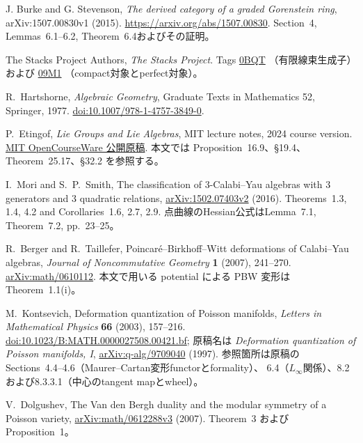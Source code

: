J. Burke and G. Stevenson, \emph{The derived category of a graded Gorenstein ring},
arXiv:1507.00830v1 (2015).
\url{https://arxiv.org/abs/1507.00830}.
Section~4, Lemmas~6.1--6.2, Theorem~6.4およびその証明。

The Stacks Project Authors, \emph{The Stacks Project}.
Tags \href{https://stacks.math.columbia.edu/tag/0BQT}{0BQT}
（有限線束生成子）および
\href{https://stacks.math.columbia.edu/tag/09M1}{09M1}
（compact対象とperfect対象）。

R.~Hartshorne,
\emph{Algebraic Geometry}, Graduate Texts in Mathematics 52,
Springer, 1977.
\href{https://doi.org/10.1007/978-1-4757-3849-0}{doi:10.1007/978-1-4757-3849-0}.

P.~Etingof,
\emph{Lie Groups and Lie Algebras}, MIT lecture notes, 2024 course version.
\href{https://live.ocw.mit.edu/courses/18-755-lie-groups-and-lie-algebras-ii-spring-2024/mit18_755_s24_lec_full.pdf}{MIT OpenCourseWare 公開原稿}.
本文では Proposition~16.9、\S19.4、Theorem~25.17、\S32.2 を参照する。

I.~Mori and S.~P.~Smith,
The classification of 3-Calabi--Yau algebras with 3 generators and 3 quadratic relations,
\href{https://arxiv.org/abs/1502.07403v2}{arXiv:1502.07403v2} (2016).
Theorems~1.3, 1.4, 4.2 and Corollaries~1.6, 2.7, 2.9.
点曲線のHessian公式はLemma~7.1, Theorem~7.2, pp.~23--25。

R.~Berger and R.~Taillefer,
Poincar\'e--Birkhoff--Witt deformations of Calabi--Yau algebras,
\emph{Journal of Noncommutative Geometry} \textbf{1} (2007), 241--270.
\href{https://arxiv.org/abs/math/0610112}{arXiv:math/0610112}.
本文で用いる potential による PBW 変形は Theorem~1.1(i)。

M.~Kontsevich,
Deformation quantization of Poisson manifolds,
\emph{Letters in Mathematical Physics} \textbf{66} (2003), 157--216.
\href{https://doi.org/10.1023/B:MATH.0000027508.00421.bf}{doi:10.1023/B:MATH.0000027508.00421.bf};
原稿名は \emph{Deformation quantization of Poisson manifolds, I},
\href{https://arxiv.org/abs/q-alg/9709040}{arXiv:q-alg/9709040} (1997).
参照箇所は原稿のSections~4.4--4.6（Maurer--Cartan変形functorとformality）、
6.4（$L_\infty$関係）、8.2および8.3.3.1（中心のtangent mapとwheel）。

V.~Dolgushev,
The Van den Bergh duality and the modular symmetry of a Poisson variety,
\href{https://arxiv.org/abs/math/0612288v3}{arXiv:math/0612288v3} (2007).
Theorem~3 および Proposition~1。

